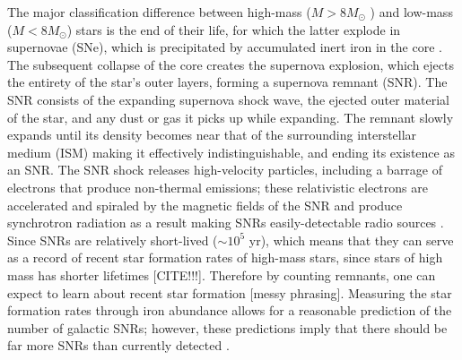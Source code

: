 \documentclass[preprint2,epsf,epsfig,graphics]{emulateapj}
\begin{document}
The major classification difference between high-mass ($M > 8M_{\odot}$ ) and low-mass ($M < 8 M_\odot$) stars is the end of their life, for which the latter explode in supernovae (SNe), which is precipitated by accumulated inert iron in the core \citep{Arnett.73}.  
The subsequent collapse of the core creates the supernova explosion, which ejects the entirety of the star’s outer layers, forming a supernova remnant (SNR).  The SNR consists of the expanding supernova shock wave, the ejected outer material of the star, and any dust or gas it picks up while expanding.  
The remnant slowly expands until its density becomes near that of the surrounding interstellar medium (ISM) making it effectively indistinguishable, and ending its existence as an SNR.  
The SNR shock releases high-velocity particles, including a barrage of electrons that produce non-thermal emissions; these relativistic electrons are accelerated and spiraled by the magnetic fields of the SNR and produce synchrotron radiation as a result making SNRs easily-detectable radio sources \citep[e.g.][]{Burbidge.56,Stupar_cat.11}. 
Since SNRs are relatively short-lived ($\sim10^5$ yr), which means that they can serve as a record of recent star formation rates of high-mass stars, since stars of high mass has shorter lifetimes {\color{red}[CITE!!!]}.  
Therefore by counting remnants, one can expect to learn about recent star formation {\color{red}[messy phrasing]}.
Measuring the star formation rates through iron abundance allows for a reasonable prediction of the number of galactic SNRs; however, these predictions imply that there should be far more SNRs than currently detected \citep[e.g.][]{Brogan.06}.  

\end{document}
